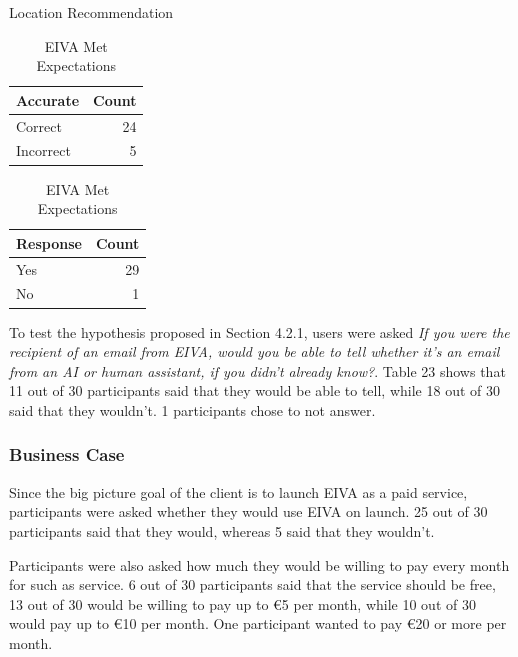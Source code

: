 \documentclass{article}
\begin{document}
\begin{table}[!htb]
	\begin{minipage}{.5\linewidth}
		\caption{Location Recommendation}
		\centering
		\begin{tabular}{lr}
			\hline
			\textbf{Accurate} & \textbf{Count} \\
			\hline
			Correct           & 24             \\
			Incorrect         & 5              \\
			\hline
		\end{tabular}
	\end{minipage}%
	\hspace{.1cm}
	\begin{minipage}{.5\linewidth}
		\centering
		\caption{EIVA Met Expectations}
		\begin{tabular}{lr}
			\hline
			\textbf{Response} & \textbf{Count} \\
			\hline
			Yes               & 29             \\
			No                & 1              \\
			\hline
		\end{tabular}
	\end{minipage} 
\end{table}

To test the hypothesis proposed in Section 4.2.1, users were asked \emph{If you were the recipient of an email from EIVA, would you be able to tell whether it's an email from an AI or human assistant, if you didn't already know?}. Table 23 shows that 11 out of 30 participants said that they would be able to tell, while 18 out of 30 said that they wouldn't. 1 participants chose to not answer.

\subsubsection{Business Case}

Since the big picture goal of the client is to launch EIVA as a paid service, participants were asked whether they would use EIVA on launch. 25 out of 30 participants said that they would, whereas 5 said that they wouldn't.

Participants were also asked how much they would be willing to pay every month for such as service. 6 out of 30 participants said that the service should be free, 13 out of 30 would be willing to pay up to €5 per month, while 10 out of 30 would pay up to €10 per month. One participant wanted to pay €20 or more per month.
\end{document}
